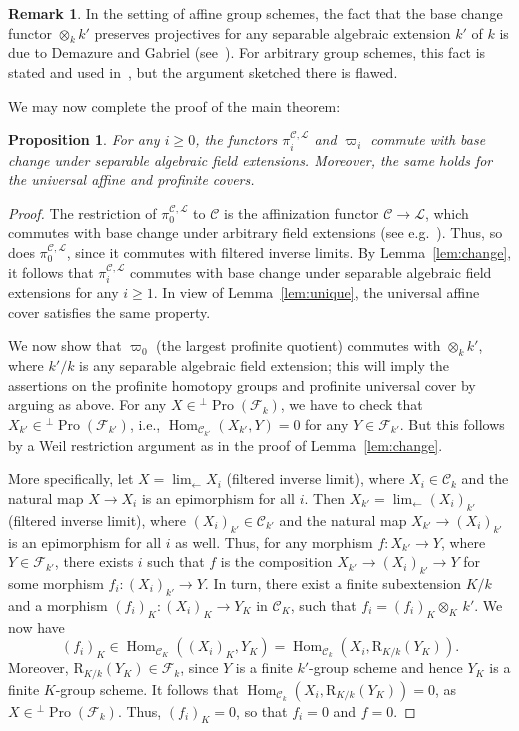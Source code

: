 \documentclass[11pt]{article}
\newtheorem{prop}[theo]{Proposition}
\theoremstyle{definition}
\newtheorem{rema}[theo]{Remark}
\numberwithin{equation}{section}
\newcommand\cC{{\mathcal C}}
\newcommand\cF{{\mathcal F}}
\newcommand\cL{{\mathcal L}}
\newcommand\R{\mathrm{R}}
\DeclareMathOperator{\Hom}{Hom}
\DeclareMathOperator{\Pro}{Pro}
\theoremstyle{remark}
\begin{document}
\begin{rema}\label{rem:change}
In the setting of affine group schemes, the fact that the base change functor $\otimes_k k'$ preserves projectives for any separable algebraic extension $k'$ of $k$ is due to Demazure and Gabriel (see~\cite[V.3.2.1]{DG}). For arbitrary group schemes, this fact is stated and used in~\cite[p.~437]{Milne}, but the argument sketched there is flawed.
\end{rema}

We may now complete the proof of the main theorem:

\begin{prop}\label{prop:separable}
For any $i \geq 0$, the functors $\pi_i^{\cC,\cL}$ and $\varpi_i$ commute with base change under separable algebraic field extensions. Moreover, the same holds for the universal affine and profinite covers.
\end{prop}

\begin{proof}
The restriction of $\pi_0^{\cC,\cL}$ to $\cC$ is the affinization functor $\cC \to \cL$, which commutes with base change under arbitrary field extensions (see e.g.~\cite[III.3.8.1]{DG}). Thus, so does $\pi_0^{\cC,\cL}$, since it commutes with filtered inverse limits. By Lemma~\ref{lem:change}, it follows that $\pi_i^{\cC,\cL}$ commutes with base change under separable algebraic field extensions for any $i \geq 1$. In view of Lemma~\ref{lem:unique}, the universal affine cover satisfies the same property.

We now show that $\varpi_0$ (the largest profinite quotient) commutes with $\otimes_k k'$, where $k'/k$ is any separable algebraic field extension; this will imply the assertions on the profinite homotopy groups and profinite universal cover by arguing as above. For any $X \in {^{\perp}\Pro(\cF_k)}$, we have to check that $X_{k'} \in {^{\perp}\Pro(\cF_{k'})}$, i.e., $\Hom_{\cC_{k'}}(X_{k'},Y) = 0$ for any $Y \in \cF_{k'}$. But this follows by a Weil restriction argument as in the proof of Lemma~\ref{lem:change}.

More specifically, let $X = \lim_{\leftarrow} X_i$ (filtered inverse limit), where $X_i \in \cC_k$ and the natural map $X \to X_i$ is an epimorphism for all $i$. Then $X_{k'} = \lim_{\leftarrow} (X_i)_{k'}$ (filtered inverse limit), where $(X_i)_{k'} \in \cC_{k'}$ and the natural map $X_{k'} \to (X_i)_{k'}$ is an epimorphism for all $i$ as well. Thus, for any morphism $f : X_{k'} \to Y$, where $Y \in \cF_{k'}$, there exists $i$ such that $f$ is the composition $X_{k'} \to (X_i)_{k'} \to Y$ for some morphism $f_i : (X_i)_{k'} \to Y$. In turn, there exist a finite subextension $K/k$ and a morphism $(f_i)_K : (X_i)_K \to Y_K$ in $\cC_K$, such that $f_i = (f_i)_K \otimes_K \, k'$. We now have
\[
(f_i)_K \in \Hom_{\cC_K}((X_i)_K, Y_K) = \Hom_{\cC_k}(X_i, \R_{K/k}(Y_K)).
\]
Moreover, $\R_{K/k}(Y_K) \in \cF_k$, since $Y$ is a finite $k'$-group scheme and hence $Y_K$ is a finite $K$-group scheme. It follows that $\Hom_{\cC_k}(X_i, \R_{K/k}(Y_K)) = 0$, as $X \in {^{\perp}\Pro(\cF_k)}$. Thus, $(f_i)_K = 0$, so that $f_i = 0$ and $f = 0$.
\end{proof}
\end{document}
